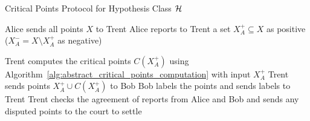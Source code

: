 \begin{algorithm2e}[htb]
\caption{Critical Points Protocol for Hypothesis Class $\mathcal{H}$}
\label{alg:abstract_critical_points_protocol}
\DontPrintSemicolon
\LinesNumbered



Alice sends all points $X$ to Trent\;
Alice reports to Trent a set $X_A^+ \subseteq X$ as positive ($X_A^- = X \setminus X_A^+$ as negative)\;


Trent computes the critical points $C(X_A^+)$ using Algorithm~\ref{alg:abstract_critical_points_computation} with input $X_A^+$\;
Trent sends points $X_A^+ \cup C(X_A^+)$ to Bob\;
Bob labels the points and sends labels to Trent\;
Trent checks the agreement of reports from Alice and Bob and sends any disputed points to the court to settle\;


\end{algorithm2e}
